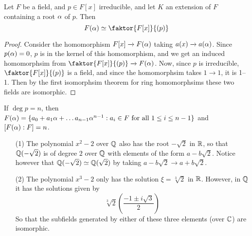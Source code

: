 \begin{theorem}\label{}
    Let $F$ be a field, and  $p \in F[x]$ irreducible, and let $K$ an extension
    of  $F$ containing a root $\alpha$ of $p$. Then
    \begin{equation*}
        F(\a) \simeq \faktor{F[x]}{(p)}
    \end{equation*}
\end{theorem}
\begin{proof}
    Consider the homomorphism $F[x] \xrightarrow{} F(\alpha)$ taking $a(x) \xrightarrow{}
    a(\alpha)$. Since  $p(\alpha)=0$, $p$ is in the kernel of this homomorphism, and we
    get an induced homomorphsim from $\faktor{F[x]}{(p)} \xrightarrow{} F(\a)$.
    Now, since $p$ is irreducible,  $\faktor{F[x]}{(p)}$ is a field, and since
    the homomorphsim takes $1 \xrightarrow{} 1$, it is 1--1. Then by the first
    isomorphsim theorem for ring homomorphsims these two fields are isomorphic.
\end{proof}
\begin{corollary}
    If $\deg{p}=n$, then $F(\alpha)=\{a_0+a_1\alpha+\dots a_{n-1}\alpha^{n-1} : a_i \in F
    \text{ for all } 1 \leq i \leq n-1\}$ and $[F(\alpha) : F]=n$.
\end{corollary}

\begin{example}\label{example_1.4}
    \begin{enumerate}
        \item[(1)] The polynomial $x^2-2$ over  $\mathbb{Q}$ also has the root
            $-\sqrt{2}$ in $\mathbb{R}$, so that $\mathbb{Q}(-\sqrt{2})$ is of degree $2$ over
            $\mathbb{Q}$ with elements of the form  $a-b\sqrt{2}$. Notice however that
            $\mathbb{Q}(-\sqrt{2}) \simeq \mathbb{Q}(\sqrt{2})$ by taking $a-b\sqrt{2}
            \xrightarrow{} a+b\sqrt{2}$.

        \item[(2)] The polynomial $x^3-2$ only has the solution
            $\xi=\sqrt[3]{2}$ in $\mathbb{R}$. However, in  $\mathbb{Q}$ it has the solutions
            given by
            \begin{equation*}
                \sqrt[3]{2}(\frac{-1 \pm i\sqrt{3}}{2})
            \end{equation*}
            So that the subfields generated by either of these three elements
            (over $\mathbb{C}$) are isomorphic.
    \end{enumerate}
\end{example}

